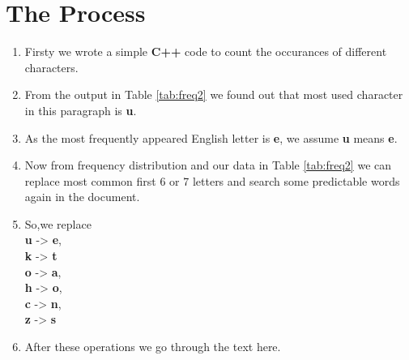 \documentclass[12pt]{report}
\begin{document}
{\section{The Process}
\begin{enumerate}
\item{%
Firsty we wrote a simple \textbf{C++} code to count the occurances of different characters.}
\item{%
From the output in Table \textcolor{green}{\ref{tab:freq2}} we found out that most used character in this paragraph is \textbf{u}.
}
\item{%
As the most frequently appeared English letter is \textbf{e}, we assume \textbf{u} means \textbf{e}.}
\item{%
Now from frequency distribution and our data in Table \ref{tab:freq2} we can replace most common first 6 or 7 letters and search some predictable words again in the document.}
\item{%
So,we replace\\ \textbf{u} -> \textbf{e},\\ \textbf{k} -> \textbf{t} \\
\textbf{o} -> \textbf{a}, \\ \textbf{h} -> \textbf{o}, \\ \textbf{c} -> \textbf{n}, \\ \textbf{z} -> \textbf{s}}
\item{%
After these operations we go through the text here.\\
\begin{minipage}{0.8\textwidth}
\begin{small}

\end{small}
\end{minipage}}
\end{enumerate}}
\end{document}
